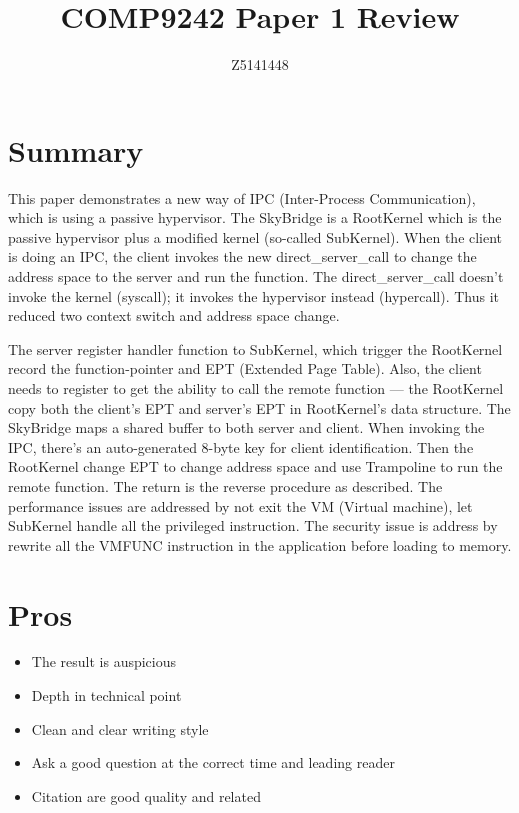 \documentclass{article}
\begin{document}
\title{COMP9242 Paper 1 Review}
\author{Z5141448}

\maketitle

\section{Summary}

This paper demonstrates a new way of IPC (Inter-Process Communication), which is using a passive hypervisor. The SkyBridge is a RootKernel which is the passive hypervisor plus a modified kernel (so-called SubKernel). When the client is doing an IPC, the client invokes the new direct\_server\_call to change the address space to the server and run the function. The direct\_server\_call doesn't invoke the kernel (syscall); it invokes the hypervisor instead (hypercall). Thus it reduced two context switch and address space change. 

The server register handler function to SubKernel, which trigger the RootKernel record the function-pointer and EPT (Extended Page Table). Also, the client needs to register to get the ability to call the remote function — the RootKernel copy both the client's EPT and server's EPT in RootKernel's data structure. The SkyBridge maps a shared buffer to both server and client. When invoking the IPC, there's an auto-generated 8-byte key for client identification. Then the RootKernel change EPT to change address space and use Trampoline to run the remote function. The return is the reverse procedure as described. The performance issues are addressed by not exit the VM (Virtual machine), let SubKernel handle all the privileged instruction. The security issue is address by rewrite all the VMFUNC instruction in the application before loading to memory. 

\section{Pros}

\begin{itemize}
    \item The result is auspicious
    \item Depth in technical point
    \item Clean and clear writing style
    \item Ask a good question at the correct time and leading reader
    \item Citation are good quality and related
\end{itemize}
\end{document}
